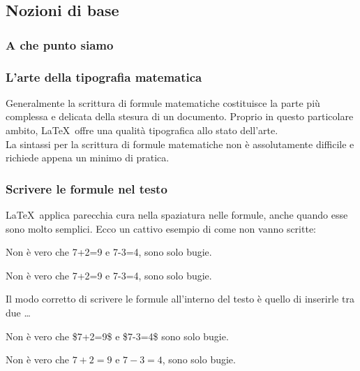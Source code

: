 \subsection{Nozioni di base}
\begin{frame}
  \frametitle{A che punto siamo}
\end{frame}
\begin{frame}
  \frametitle{L'arte della tipografia matematica}
	Generalmente la scrittura di formule matematiche costituisce la parte pi\`u complessa e delicata della stesura di un documento. Proprio in questo particolare ambito, \LaTeX\ offre una qualit\`a tipografica allo stato dell'arte.\\
  \medskip
	La sintassi per la scrittura di formule matematiche non \`e assolutamente difficile e richiede appena un minimo di pratica.
\end{frame}
\begin{frame}
  \frametitle{Scrivere le formule nel testo}
	\LaTeX\ applica parecchia cura nella spaziatura nelle formule, anche quando esse sono molto semplici. Ecco un cattivo esempio di come non vanno scritte:
	\begin{LaTeXcode}
		Non \`e vero che 7+2=9 e 7-3=4, sono solo bugie.
	\end{LaTeXcode}
	\begin{LaTeXoutput}
		Non \`e vero che 7+2=9 e 7-3=4,  sono solo bugie.
	\end{LaTeXoutput}
  \smallskip
	Il modo corretto di scrivere le formule all'interno del testo \`e quello di inserirle tra due \LCmd[]{\textdollar}\dots\LCmd[]{\textdollar}
	\begin{LaTeXcode}
		Non \`e vero che \alert{\$7+2=9\$} e \alert{\$7-3=4\$} sono solo bugie.
	\end{LaTeXcode}
	\begin{LaTeXoutput}
		Non \`e vero che $7+2=9$ e $7-3=4$, sono solo bugie.
	\end{LaTeXoutput}
\end{frame}
